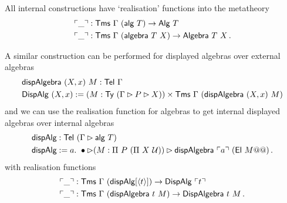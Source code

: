 All internal constructions have `realisation' functions into the metatheory
\begin{align*}
    &\ulcorner \_ \urcorner : \textsf{Tms}\ \Gamma\ (\textsf{alg}\ T) \to \textsf{Alg}\ T \\
    &\ulcorner \_ \urcorner : \textsf{Tms}\ \Gamma\ (\textsf{algebra}\ T\ X) \to \textsf{Algebra}\ T\ X \,.
\end{align*}


A similar construction can be performed for displayed algebras over external algebras
\begin{align*}
&\textsf{dispAlgebra}\ (X, x)\ M : \textsf{Tel}\ \Gamma \\
&\textsf{DispAlg}\ (X, x) := (M : \textsf{Ty}\ (\Gamma \rhd P \rhd X)) \times \textsf{Tms}\ \Gamma\ (\textsf{dispAlgebra}\ (X, x)\ M)
\end{align*}
and we can use the realisation function for algebras to get internal displayed
algebras over internal algebras
\begin{align*}
    &\textsf{dispAlg} : \textsf{Tel}\ (\Gamma \rhd \textsf{alg}\ T) \\
    &\textsf{dispAlg} := a.\ \bullet \rhd (M : \Pi\ P\ (\Pi\ X\ \mathcal{U})) \rhd \textsf{dispAlgebra}\ \ulcorner a \urcorner\ (\textsf{El}\ M@@) \,.
\end{align*}
with realisation functions
\begin{align*}
    &\ulcorner \_ \urcorner : \textsf{Tms}\ \Gamma\ (\textsf{dispAlg}[\langle t\rangle]) \to \textsf{DispAlg}\ \ulcorner t \urcorner \\
    &\ulcorner \_ \urcorner : \textsf{Tms}\ \Gamma\ (\textsf{dispAlgebra}\ t\ M) \to \textsf{DispAlgebra}\ t\ M \,.
\end{align*}

